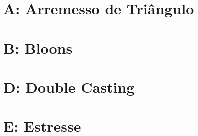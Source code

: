 \documentclass[12pt,oneside]{article} %
\begin{document}
\clearpage

\pagestyle{fancy}
\renewcommand{\footrulewidth}{0.7pt}
\renewcommand{\headrulewidth}{0.7pt}
\cfoot{\thepage}

\newpage
\section*{A: Arremesso de Triângulo} %

%

\newpage
\section*{B: Bloons} %

%

%
%

\newpage
\section*{D: Double Casting} %



\newpage
\section*{E: Estresse} %



%
%

%
%
\end{document}

